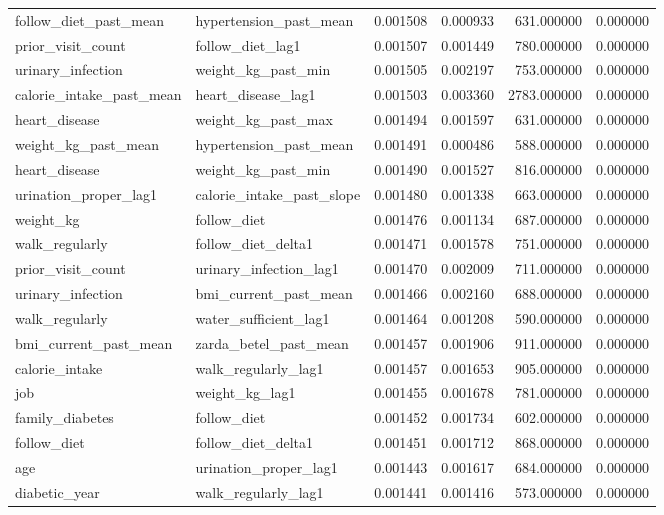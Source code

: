 \begin{longtable}{llrrrr}
follow\_diet\_past\_mean & hypertension\_past\_mean & 0.001508 & 0.000933 & 631.000000 & 0.000000 \\
prior\_visit\_count & follow\_diet\_lag1 & 0.001507 & 0.001449 & 780.000000 & 0.000000 \\
urinary\_infection & weight\_kg\_past\_min & 0.001505 & 0.002197 & 753.000000 & 0.000000 \\
calorie\_intake\_past\_mean & heart\_disease\_lag1 & 0.001503 & 0.003360 & 2783.000000 & 0.000000 \\
heart\_disease & weight\_kg\_past\_max & 0.001494 & 0.001597 & 631.000000 & 0.000000 \\
weight\_kg\_past\_mean & hypertension\_past\_mean & 0.001491 & 0.000486 & 588.000000 & 0.000000 \\
heart\_disease & weight\_kg\_past\_min & 0.001490 & 0.001527 & 816.000000 & 0.000000 \\
urination\_proper\_lag1 & calorie\_intake\_past\_slope & 0.001480 & 0.001338 & 663.000000 & 0.000000 \\
weight\_kg & follow\_diet & 0.001476 & 0.001134 & 687.000000 & 0.000000 \\
walk\_regularly & follow\_diet\_delta1 & 0.001471 & 0.001578 & 751.000000 & 0.000000 \\
prior\_visit\_count & urinary\_infection\_lag1 & 0.001470 & 0.002009 & 711.000000 & 0.000000 \\
urinary\_infection & bmi\_current\_past\_mean & 0.001466 & 0.002160 & 688.000000 & 0.000000 \\
walk\_regularly & water\_sufficient\_lag1 & 0.001464 & 0.001208 & 590.000000 & 0.000000 \\
bmi\_current\_past\_mean & zarda\_betel\_past\_mean & 0.001457 & 0.001906 & 911.000000 & 0.000000 \\
calorie\_intake & walk\_regularly\_lag1 & 0.001457 & 0.001653 & 905.000000 & 0.000000 \\
job & weight\_kg\_lag1 & 0.001455 & 0.001678 & 781.000000 & 0.000000 \\
family\_diabetes & follow\_diet & 0.001452 & 0.001734 & 602.000000 & 0.000000 \\
follow\_diet & follow\_diet\_delta1 & 0.001451 & 0.001712 & 868.000000 & 0.000000 \\
age & urination\_proper\_lag1 & 0.001443 & 0.001617 & 684.000000 & 0.000000 \\
diabetic\_year & walk\_regularly\_lag1 & 0.001441 & 0.001416 & 573.000000 & 0.000000 \\

\end{longtable}
